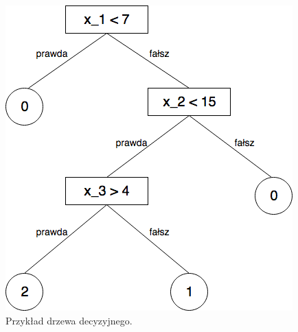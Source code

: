 \begin{figure}[ht!]
\centering
\includegraphics[scale=0.6]{res/dt1.png}
\caption[Caption for LOF]{Przykład drzewa decyzyjnego.\label{dt1image}}
\end{figure} 

